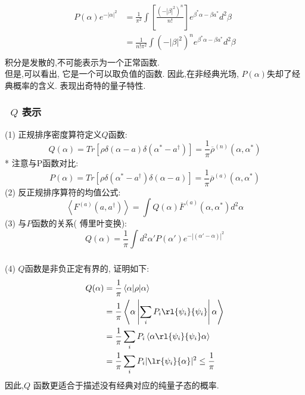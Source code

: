     \begin{frame} 
    \frametitle{}
    \[ \begin{aligned}
      P(\alpha) e^{-\left|\alpha\right|^2}&= \frac{1}{\pi^2}\int [\frac{(- \left|\beta\right|^2)^n}{n!}  ]  e^{\beta^* \alpha - \beta a^*}  d^2 \beta \\ 
    &= \frac{1}{n!\pi^2}\int (- \left|\beta\right|^2)^n    e^{\beta^* \alpha - \beta a^*}  d^2 \beta \\ 
    \end{aligned}\]
    积分是发散的,不可能表示为一个正常函数.\\
    但是,可以看出, 它是一个可以取负值的函数. 因此,在非经典光场, $P(\alpha) $失却了经典概率的含义. 表现出奇特的量子特性.
    \end{frame}

    \begin{frame} 
      \frametitle{~$Q$ 表示}
      (1) 正规排序密度算符定义$Q$函数:
      \[ Q(\alpha) = Tr[\rho \delta(\alpha-a)\delta(\alpha^*-a^{\dagger})]=\frac{1}{\pi} \overline{\rho}^{(n)}(\alpha, \alpha^*) \]
      * 注意与P函数对比:
      \[ P(\alpha) = Tr[\rho \delta(\alpha^* -a^{\dagger})\delta(\alpha -a)]=\frac{1}{\pi} \overline{\rho}^{(a)}(\alpha, \alpha^*) \]
      (2) 反正规排序算符的均值公式:
      \[ \left\langle F^{(a)}(a, a^{\dagger}) \right\rangle = \int Q(\alpha) \overline{F}^{(a)} (\alpha, \alpha^{*}) d^2 \alpha\]
      (3) 与$P$函数的关系( 傅里叶变换):
      \[ Q(\alpha) = \frac{1}{\pi} \int  d^2 \alpha' P(\alpha') e^{-\left|(\alpha'-\alpha)\right|^2}\]
    \end{frame}

  \begin{frame} 
  \frametitle{}
      (4) $Q$函数是非负正定有界的, 证明如下:
      \[ \begin{aligned}
      Q(\alpha) &= \frac{1}{\pi} \left\langle \alpha|\rho | \alpha \right\rangle  \\
       &= \frac{1}{\pi} \left\langle \alpha \left| \sum_i P_i \rl{\psi_i} {\psi_i} \right| \alpha \right\rangle \\
       &= \frac{1}{\pi} \sum_i P_i \left\langle \alpha \rl{\psi_i} {\psi_i}\alpha \right\rangle \\ 
       &= \frac{1}{\pi} \sum_i P_i |\lr{\psi_i}{\alpha}|^2
       \leq \frac{1}{\pi}
      \end{aligned}\] 
      因此,$Q$ 函数更适合于描述没有经典对应的纯量子态的概率. 
  \end{frame}


